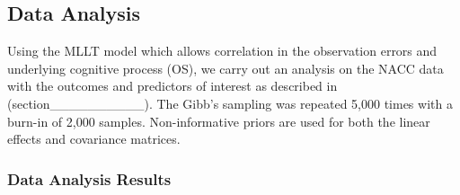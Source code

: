 \documentclass[
]{article}
\author{}
\date{\vspace{-2.5em}}
\begin{document}
\hypertarget{data-analysis}{%
\subsection{Data Analysis}\label{data-analysis}}

Using the MLLT model which allows correlation in the observation errors and underlying cognitive process (OS), we carry out an analysis on the NACC data with the outcomes and predictors of interest as described in (section\_\_\_\_\_\_\_\_\_\_). The Gibb's sampling was repeated 5,000 times with a burn-in of 2,000 samples. Non-informative priors are used for both the linear effects and covariance matrices.

\hypertarget{data-analysis-results}{%
\subsubsection{Data Analysis Results}\label{data-analysis-results}}

\begingroup\fontsize{7}{9}\selectfont
\end{document}

